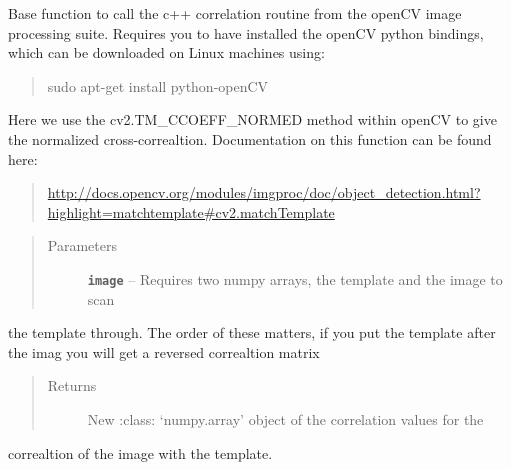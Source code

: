 \documentclass[a4paper,10pt,english]{sphinxmanual}
\begin{document}

\begin{fulllineitems}
\label{modules:match_filter.normxcorr2}
Base function to call the c++ correlation routine from the openCV image
processing suite.  Requires you to have installed the openCV python
bindings, which can be downloaded on Linux machines using:
\begin{quote}

sudo apt-get install python-openCV
\end{quote}

Here we use the cv2.TM\_CCOEFF\_NORMED method within openCV to give the
normalized cross-correaltion.  Documentation on this function can be
found here:
\begin{quote}

\href{http://docs.opencv.org/modules/imgproc/doc/object\_detection.html?highlight=matchtemplate\#cv2.matchTemplate}{http://docs.opencv.org/modules/imgproc/doc/object\_detection.html?highlight=matchtemplate\#cv2.matchTemplate}
\end{quote}
\begin{quote}\begin{description}
\item[{Parameters}] \leavevmode
\textbf{\texttt{image}} -- Requires two numpy arrays, the template and the image to scan

\end{description}\end{quote}

the template through.  The order of these matters, if you put the template
after the imag you will get a reversed correaltion matrix
\begin{quote}\begin{description}
\item[{Returns}] \leavevmode
New :class: `numpy.array' object of the correlation values for the

\end{description}\end{quote}

correaltion of the image with the template.

\end{fulllineitems}
\end{document}

